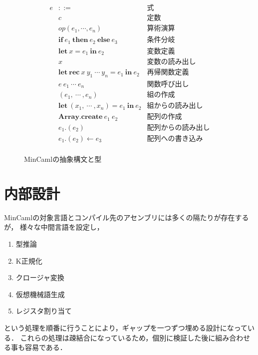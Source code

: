 \documentclass{sumiilab-paper}
\newcommand{\keyword}[1]{\mathbf{#1}}
\newcommand{\IF}{\keyword{if}}
\newcommand{\THEN}{\keyword{then}}
\newcommand{\ELSE}{\keyword{else}}
\newcommand{\LET}{\keyword{let}}
\newcommand{\REC}{\keyword{rec}}
\newcommand{\ARRAY}{\keyword{Array}}
\newcommand{\CREATE}{\keyword{create}}
\newcommand{\IN}{\keyword{in}}
\begin{document}
\begin{figure}[htbp]
	\[ \begin{array}{lll}
			e & ::= & \mbox{式} \\
				& c	& \mbox{定数} \\
			 	& \textit{op} (e_1,\cdots,e_n) & \mbox{算術演算} \\
				& \IF~e_1~\THEN~e_2~\ELSE~e_3 & \mbox{条件分岐} \\
			 	& \LET~x=e_1~\IN~e_2 & \mbox{変数定義} \\
				& x & \mbox{変数の読み出し} \\
				& \LET~\REC~x~y_1~\cdots~y_n=e_1~\IN~e_2 & \mbox{再帰関数定義} \\
				& e~e_1~\cdots~e_n & \mbox{関数呼び出し} \\
				& (e_1,~\cdots~,e_n) & \mbox{組の作成} \\
				& \LET~(x_1,~\cdots~,x_n)=e_1~\IN~e_2 & \mbox{組からの読み出し} \\
				& \ARRAY.\CREATE~e_1~e_2 & \mbox{配列の作成} \\
				& e_1.(e_2) & \mbox{配列からの読み出し} \\
				& e_1.(e_2)\leftarrow e_3 & \mbox{配列への書き込み} \\
	\end{array} \]
	\caption{MinCamlの抽象構文と型}
	\label{eqn:mincaml-ast}
\end{figure}

\section{内部設計}
MinCamlの対象言語とコンパイル先のアセンブリには多くの隔たりが存在するが，
様々な中間言語を設定し，
\begin{enumerate}
	\item 型推論
	\item K正規化
	\item クロージャ変換
	\item 仮想機械語生成
	\item レジスタ割り当て
\end{enumerate}
という処理を順番に行うことにより，ギャップを一つずつ埋める設計になっている．
これらの処理は疎結合になっているため，個別に検証した後に組み合わせる事も容易である．
\end{document}
